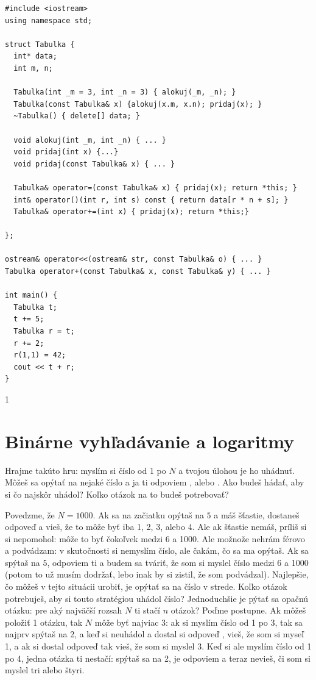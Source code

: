 \documentclass[10pt]{article}
\def\ods{\vspace*{10pt}}
\def\sectxxii{1} %
\def\sectxxii{0} %
\begin{document}
\begin{lstlisting}
#include <iostream>
using namespace std;

struct Tabulka {
  int* data;
  int m, n;

  Tabulka(int _m = 3, int _n = 3) { alokuj(_m, _n); }
  Tabulka(const Tabulka& x) {alokuj(x.m, x.n); pridaj(x); }
  ~Tabulka() { delete[] data; }

  void alokuj(int _m, int _n) { ... }
  void pridaj(int x) {...}
  void pridaj(const Tabulka& x) { ... }

  Tabulka& operator=(const Tabulka& x) { pridaj(x); return *this; }
  int& operator()(int r, int s) const { return data[r * n + s]; }
  Tabulka& operator+=(int x) { pridaj(x); return *this;}

};

ostream& operator<<(ostream& str, const Tabulka& o) { ... }
Tabulka operator+(const Tabulka& x, const Tabulka& y) { ... }

int main() {
  Tabulka t;
  t += 5;
  Tabulka r = t;
  r += 2;
  r(1,1) = 42;
  cout << t + r;
}
\end{lstlisting}


\fi

\if\sectxxii1
\section{Binárne vyhľadávanie a logaritmy}
\label{sect:binarysearch}

Hrajme takúto hru: myslím si číslo od 1 po $N$ a tvojou úlohou je ho uhádnuť. Môžeš
sa opýtať na nejaké číslo a ja ti odpoviem ,  alebo .
Ako budeš hádať, aby si čo najskôr uhádol? Koľko otázok na to budeš potrebovať?

\ods 
Povedzme, že $N=1000$. Ak sa na začiatku opýtaš na $5$ a máš šťastie, dostaneš odpoveď
 a vieš, že to môže byť iba 1, 2, 3, alebo 4. Ale ak šťastie nemáš,
príliš si si nepomohol: môže to byť čokoľvek medzi 6 a 1000. Ale možnože nehrám férovo a
podvádzam: v skutočnosti si nemyslím číslo, ale čakám, čo sa ma opýtaš. Ak sa spýtaš na $5$,
odpoviem ti  a budem sa tváriť, že som si myslel číslo medzi 6 a 1000 (potom 
to už musím dodržať, lebo inak by si zistil, že som podvádzal). Najlepšie, čo môžeš 
v tejto situácii urobiť,
je opýtať sa na číslo v strede. Koľko otázok potrebuješ, aby si touto stratégiou 
uhádol číslo? Jednoduchšie je pýtať sa opačnú otázku: pre aký najväčší rozsah $N$
ti stačí $n$ otázok? Poďme postupne. Ak môžeš položiť 1 otázku, tak $N$ môže byť najviac 
$3$: ak si myslím číslo od 1 po 3, tak sa najprv spýtaš na 2, a keď si neuhádol a dostal
si odpoveď , vieš, že som si myseľ 1, a ak si dostal odpoveď  tak vieš,
že som si myslel 3. Keď si ale myslím číslo od 1 po 4, jedna otázka ti nestačí: spýtaš sa
na 2, je odpoviem  a teraz nevieš, či som si myslel tri alebo štyri.
\end{document}
